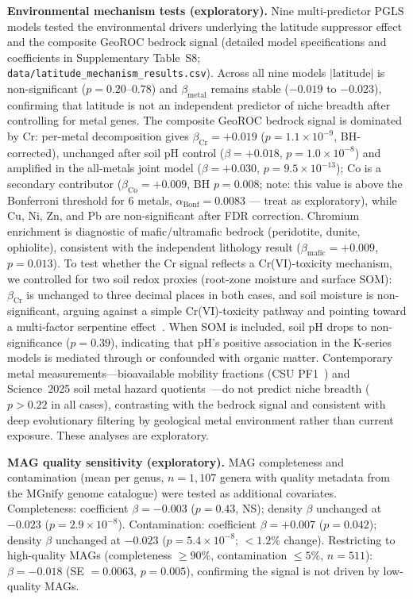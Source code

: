 \documentclass[times]{zHenriquesLab-StyleBioRxiv}
\begin{document}
\textbf{Environmental mechanism tests (exploratory).} Nine multi-predictor PGLS models tested the environmental drivers underlying the latitude suppressor effect and the composite GeoROC bedrock signal (detailed model specifications and coefficients in Supplementary Table~S8; \texttt{data/latitude\_mechanism\_results.csv}). Across all nine models $|\mathrm{latitude}|$ is non-significant ($p = 0.20$--$0.78$) and $\beta_\mathrm{metal}$ remains stable ($-0.019$ to $-0.023$), confirming that latitude is not an independent predictor of niche breadth after controlling for metal genes. The composite GeoROC bedrock signal is dominated by Cr: per-metal decomposition gives $\beta_\mathrm{Cr} = +0.019$ ($p = 1.1 \times 10^{-9}$, BH-corrected), unchanged after soil pH control ($\beta = +0.018$, $p = 1.0 \times 10^{-8}$) and amplified in the all-metals joint model ($\beta = +0.030$, $p = 9.5 \times 10^{-13}$); Co is a secondary contributor ($\beta_\mathrm{Co} = +0.009$, BH $p = 0.008$; note: this value is above the Bonferroni threshold for 6 metals, $\alpha_\text{Bonf} = 0.0083$ — treat as exploratory), while Cu, Ni, Zn, and Pb are non-significant after FDR correction. Chromium enrichment is diagnostic of mafic/ultramafic bedrock (peridotite, dunite, ophiolite), consistent with the independent lithology result ($\beta_\mathrm{mafic} = +0.009$, $p = 0.013$). To test whether the Cr signal reflects a Cr(VI)-toxicity mechanism, we controlled for two soil redox proxies (root-zone moisture and surface SOM): $\beta_\mathrm{Cr}$ is unchanged to three decimal places in both cases, and soil moisture is non-significant, arguing against a simple Cr(VI)-toxicity pathway and pointing toward a multi-factor serpentine effect~\cite{oline2006}. When SOM is included, soil pH drops to non-significance ($p = 0.39$), indicating that pH's positive association in the K-series models is mediated through or confounded with organic matter. Contemporary metal measurements---bioavailable mobility fractions (CSU PF1~\cite{qi2025}) and Science~2025 soil metal hazard quotients~\cite{hou2025}---do not predict niche breadth ($p > 0.22$ in all cases), contrasting with the bedrock signal and consistent with deep evolutionary filtering by geological metal environment rather than current exposure. These analyses are exploratory.

\textbf{MAG quality sensitivity (exploratory).} MAG completeness and
contamination (mean per genus, $n = 1{,}107$ genera with quality metadata from
the MGnify genome catalogue) were tested as additional covariates.
Completeness: coefficient $\beta = -0.003$ ($p = 0.43$, NS); density $\beta$
unchanged at $-0.023$ ($p = 2.9 \times 10^{-8}$). Contamination: coefficient
$\beta = +0.007$ ($p = 0.042$); density $\beta$ unchanged at $-0.023$
($p = 5.4 \times 10^{-8}$; ${<}1.2\%$ change). Restricting to high-quality
MAGs (completeness $\geq 90\%$, contamination $\leq 5\%$, $n = 511$):
$\beta = -0.018$ (SE $= 0.0063$, $p = 0.005$), confirming the signal is not
driven by low-quality MAGs.
\end{document}
